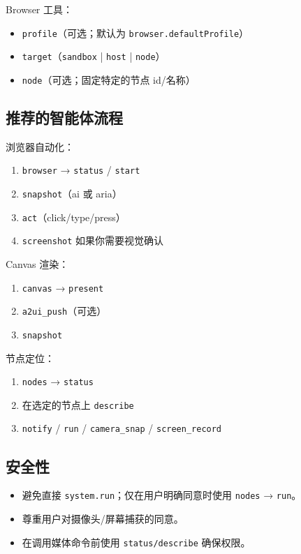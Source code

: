 Browser 工具：

\begin{itemize}
  \item \texttt{profile}（可选；默认为 \texttt{browser.defaultProfile}）
  \item \texttt{target}（\texttt{sandbox} | \texttt{host} | \texttt{node}）
  \item \texttt{node}（可选；固定特定的节点 id/名称）
\end{itemize}


\subsection{推荐的智能体流程}


浏览器自动化：

\begin{enumerate}
  \item \texttt{browser} → \texttt{status} / \texttt{start}
  \item \texttt{snapshot}（ai 或 aria）
  \item \texttt{act}（click/type/press）
  \item \texttt{screenshot} 如果你需要视觉确认
\end{enumerate}


Canvas 渲染：

\begin{enumerate}
  \item \texttt{canvas} → \texttt{present}
  \item \texttt{a2ui\_push}（可选）
  \item \texttt{snapshot}
\end{enumerate}


节点定位：

\begin{enumerate}
  \item \texttt{nodes} → \texttt{status}
  \item 在选定的节点上 \texttt{describe}
  \item \texttt{notify} / \texttt{run} / \texttt{camera\_snap} / \texttt{screen\_record}
\end{enumerate}


\subsection{安全性}


\begin{itemize}
  \item 避免直接 \texttt{system.run}；仅在用户明确同意时使用 \texttt{nodes} → \texttt{run}。
  \item 尊重用户对摄像头/屏幕捕获的同意。
  \item 在调用媒体命令前使用 \texttt{status/describe} 确保权限。
\end{itemize}


